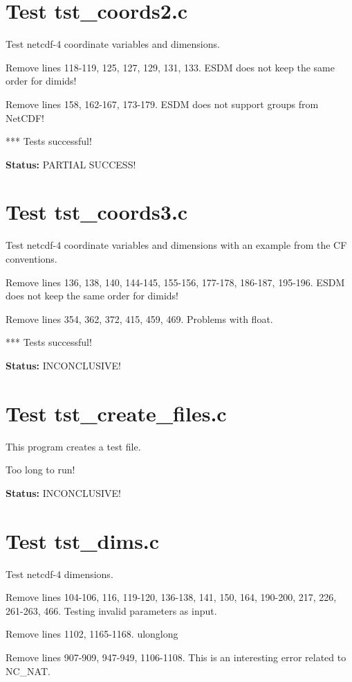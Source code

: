\section{Test tst\_coords2.c}

Test netcdf-4 coordinate variables and dimensions.

Remove lines 118-119, 125, 127, 129, 131, 133. ESDM does not keep the same order for dimids!

Remove lines 158, 162-167, 173-179. ESDM does not support groups from NetCDF!

*** Tests successful!

{\bf \large Status: } PARTIAL SUCCESS!

\section{Test tst\_coords3.c}

Test netcdf-4 coordinate variables and dimensions with an example from the CF conventions.

Remove lines 136, 138, 140, 144-145, 155-156, 177-178, 186-187, 195-196. ESDM does not keep the same order for dimids!

Remove lines 354, 362, 372, 415, 459, 469. Problems with float.

*** Tests successful!

{\bf \large Status: } INCONCLUSIVE!

\section{Test tst\_create\_files.c}

This program creates a test file.

Too long to run!

{\bf \large Status: } INCONCLUSIVE!

\section{Test tst\_dims.c}

Test netcdf-4 dimensions.

Remove lines 104-106, 116, 119-120, 136-138, 141, 150, 164, 190-200, 217, 226, 261-263, 466. Testing invalid parameters as input.

Remove lines 1102, 1165-1168. ulonglong

Remove lines 907-909, 947-949, 1106-1108. This is an interesting error related to NC\_NAT.

